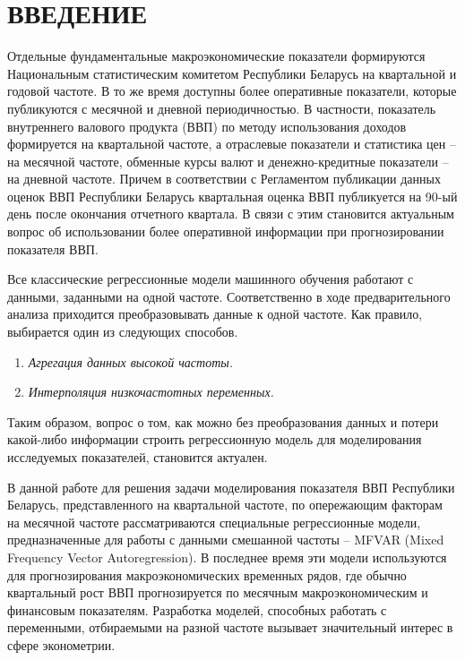 \documentclass[a4paper, 14pt]{extreport}
\numberwithin{equation}{section}
\numberwithin{equation}{section}
\begin{document}
	
	\tableofcontents
	\newpage
	\chapter*{\centering ВВЕДЕНИЕ}
	Отдельные фундаментальные макроэкономические показатели формируются Национальным статистическим комитетом Республики Беларусь на квартальной и годовой частоте. В то же время доступны более оперативные показатели, которые публикуются с месячной и дневной периодичностью.
	В частности, показатель внутреннего валового продукта (ВВП) по методу использования доходов формируется на квартальной частоте, а отраслевые показатели и статистика цен – на месячной частоте, обменные курсы валют и денежно-кредитные показатели – на дневной частоте. 
	Причем в соответствии с Регламентом публикации данных оценок ВВП Республики Беларусь квартальная оценка ВВП публикуется на 90-ый день после окончания отчетного квартала. В связи с этим становится актуальным вопрос об использовании более оперативной информации при прогнозировании показателя ВВП.
	
	Все классические регрессионные модели машинного обучения работают с данными, заданными на одной частоте.  Соответственно в ходе предварительного анализа приходится преобразовывать данные к одной частоте. Как правило, выбирается один из следующих способов.
	\begin{enumerate}
		\item \textit{Агрегация данных высокой частоты. }
		
		\item \textit{Интерполяция низкочастотных
			переменных.}
	
	\end{enumerate}
	
	Таким образом, вопрос о том, как можно без преобразования данных и потери какой-либо информации строить регрессионную модель для моделирования исследуемых показателей, становится актуален.
	
	В данной работе для решения задачи моделирования показателя ВВП Республики Беларусь, представленного на квартальной частоте, по опережающим факторам на месячной частоте рассматриваются специальные регрессионные модели, предназначенные для работы с данными смешанной частоты -- MFVAR (Mixed Frequency Vector Autoregression). В последнее время эти модели используются для прогнозирования макроэкономических временных рядов, где обычно квартальный
	рост ВВП прогнозируется по месячным макроэкономическим и финансовым показателям. Разработка моделей, способных работать с переменными, отбираемыми на разной частоте вызывает значительный интерес в сфере эконометрии.
	
\end{document}
